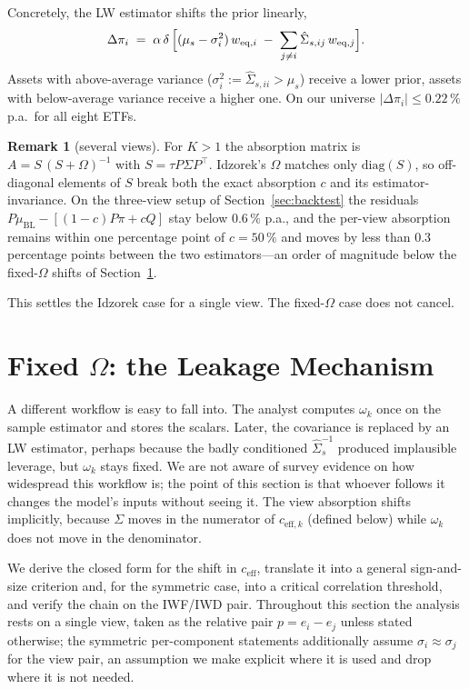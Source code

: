 \documentclass[a4paper,11pt]{article}
\theoremstyle{plain}
\theoremstyle{definition}
\newtheorem{remark}[proposition]{Remark}
\newcommand{\Om}{\Omega}
\newcommand{\muBL}{\mu_{\mathrm{BL}}}
\newcommand{\eff}{\mathrm{eff}}
\begin{document}
Concretely, the LW estimator shifts the prior linearly,
\[
  \Delta\pi_i \;=\; \alpha\,\delta\,\Bigl[(\mu_s - \sigma_i^2)\,w_{\mathrm{eq},i}
        \;-\; \sum_{j\neq i}\hat\Sigma_{s,ij}\,w_{\mathrm{eq},j}\Bigr].
\]
Assets with above-average variance ($\sigma_i^2 := \hat\Sigma_{s,ii} >
\mu_s$) receive a lower prior, assets with below-average variance receive
a higher one. On our universe $|\Delta\pi_i| \leq 0.22\,\%$ p.a.\ for all
eight ETFs.

\begin{remark}[several views]\label{rem:multiview}
For $K > 1$ the absorption matrix is $A = S\,(S + \Om)^{-1}$ with
$S = \tau P\Sigma P^\top$. Idzorek's $\Omega$ matches only
$\mathrm{diag}(S)$, so off-diagonal elements of $S$ break both the exact
absorption $c$ and its estimator-invariance. On the three-view setup of
Section~\ref{sec:backtest} the residuals
$P\muBL - [(1-c)P\pi + cQ]$ stay below $0.6\,\%$ p.a., and the per-view
absorption remains within one percentage point of $c = 50\,\%$ and moves
by less than $0.3$ percentage points between the two estimators---an
order of magnitude below the fixed-$\Omega$ shifts of
Section~\ref{sec:fixed-omega}.
\end{remark}

This settles the Idzorek case for a single view. The fixed-$\Omega$ case
does not cancel.

\section{Fixed $\Omega$: the Leakage Mechanism}
\label{sec:fixed-omega}

A different workflow is easy to fall into. The analyst computes
$\omega_k$ once on the sample estimator and stores the scalars. Later,
the covariance is replaced by an LW estimator, perhaps because the badly
conditioned $\hat\Sigma_s^{-1}$ produced implausible leverage, but
$\omega_k$ stays fixed. We are not aware of survey evidence on how
widespread this workflow is; the point of this section is that whoever
follows it changes the model's inputs without seeing it. The view
absorption shifts implicitly, because $\Sigma$ moves in the numerator of
$c_{\eff,k}$ (defined below) while $\omega_k$ does not move in the
denominator.

We derive the closed form for the shift in $c_{\eff}$, translate it into
a general sign-and-size criterion and, for the symmetric case, into a
critical correlation threshold, and verify the chain on the IWF/IWD
pair. Throughout this section the analysis rests on a single view, taken as
the relative pair $p = e_i - e_j$ unless stated otherwise; the
symmetric per-component statements additionally assume
$\sigma_i \approx \sigma_j$ for the view pair, an assumption we make
explicit where it is used and drop where it is not needed.
\end{document}
